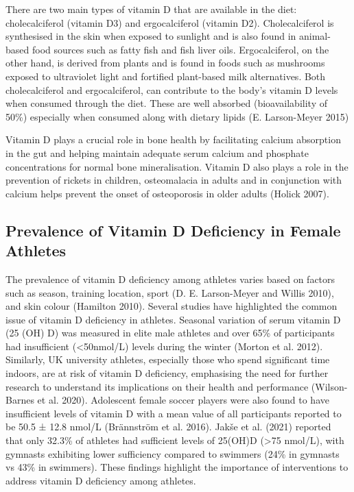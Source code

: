 \documentclass[
]{article}
\begin{document}
There are two main types of vitamin D that are available in the diet: cholecalciferol (vitamin D3) and ergocalciferol (vitamin D2). Cholecalciferol is synthesised in the skin when exposed to sunlight and is also found in animal-based food sources such as fatty fish and fish liver oils. Ergocalciferol, on the other hand, is derived from plants and is found in foods such as mushrooms exposed to ultraviolet light and fortified plant-based milk alternatives. Both cholecalciferol and ergocalciferol, can contribute to the body's vitamin D levels when consumed through the diet. These are well absorbed (bioavailability of 50\%) especially when consumed along with dietary lipids (E. Larson-Meyer 2015)

Vitamin D plays a crucial role in bone health by facilitating calcium absorption in the gut and helping maintain adequate serum calcium and phosphate concentrations for normal bone mineralisation. Vitamin D also plays a role in the prevention of rickets in children, osteomalacia in adults and in conjunction with calcium helps prevent the onset of osteoporosis in older adults (Holick 2007).

\subsection{Prevalence of Vitamin D Deficiency in Female Athletes}\label{prevalence-of-vitamin-d-deficiency-in-female-athletes}

The prevalence of vitamin D deficiency among athletes varies based on factors such as season, training location, sport (D. E. Larson-Meyer and Willis 2010), and skin colour (Hamilton 2010). Several studies have highlighted the common issue of vitamin D deficiency in athletes. Seasonal variation of serum vitamin D (25 (OH) D) was measured in elite male athletes and over 65\% of participants had insufficient (\textless50nmol/L) levels during the winter (Morton et al. 2012). Similarly, UK university athletes, especially those who spend significant time indoors, are at risk of vitamin D deficiency, emphasising the need for further research to understand its implications on their health and performance (Wilson-Barnes et al. 2020). Adolescent female soccer players were also found to have insufficient levels of vitamin D with a mean value of all participants reported to be 50.5 ± 12.8 nmol/L (Brännström et al. 2016). Jakše et al. (2021) reported that only 32.3\% of athletes had sufficient levels of 25(OH)D (\textgreater75 nmol/L), with gymnasts exhibiting lower sufficiency compared to swimmers (24\% in gymnasts vs 43\% in swimmers). These findings highlight the importance of interventions to address vitamin D deficiency among athletes.
\end{document}

